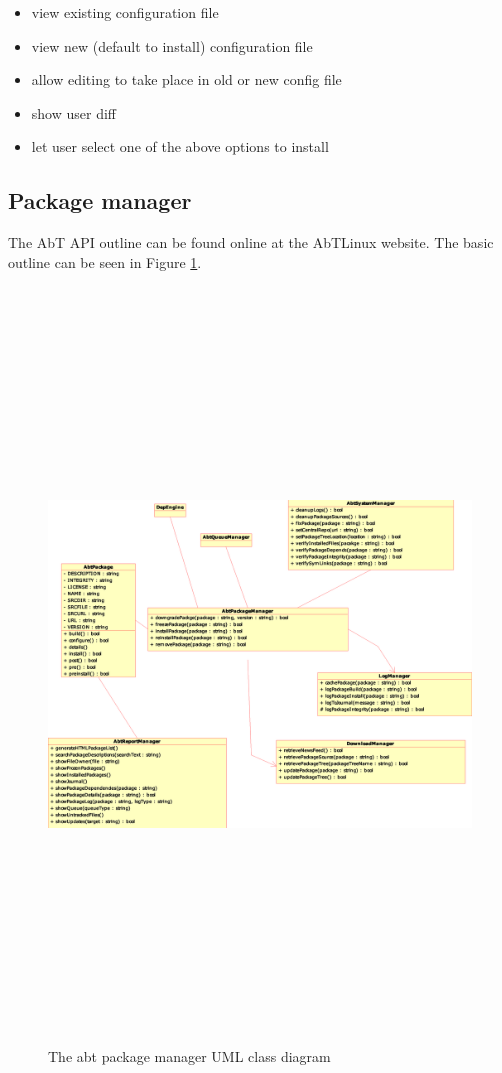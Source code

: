 \begin{itemize}
  \item view existing configuration file
  \item view new (default to install) configuration file
  \item allow editing to take place in old or new config file
  \item show user diff
  \item let user select one of the above options to install
\end{itemize}


\subsection{Package manager}
The AbT API outline can be found online at the AbTLinux website. The basic outline can be seen in Figure \ref{fig:abtapi}.

\begin{figure}
	\centering
	\includegraphics[width=15cm,height=20cm]{umlDesign.eps}
	\caption{The abt package manager UML class diagram}
	\label{fig:abtapi}
\end{figure}



